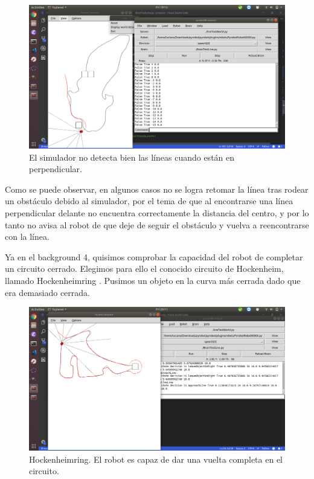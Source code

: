 \documentclass{article}
\begin{document}
\begin{figure}[H]
    \centering
    \includegraphics[width=12cm]{mapa3.png}
    \caption{El simulador no detecta bien las líneas cuando están en perpendicular.}
    \label{fig:mapa3}
\end{figure}

Como se puede observar, en algunos casos no se logra retomar la línea tras rodear un obstáculo debido al simulador, por el tema de que al encontrarse una línea perpendicular delante  no encuentra correctamente la distancia del centro, y por lo tanto no avisa al robot de que deje de seguir el obstáculo y vuelva a reencontrarse con la línea.


Ya en el background 4, quisimos comprobar la capacidad del robot de completar un circuito cerrado. Elegimos para ello el conocido circuito de Hockenheim, llamado Hockenheimring \cite{hockenheimring}. Pusimos un objeto en la curva más cerrada dado que era demasiado cerrada.

\begin{figure}[H]
    \centering
    \includegraphics[width=12cm]{mapa4.png}
    \caption{Hockenheimring. El robot es capaz de dar una vuelta completa en el circuito.}
    \label{fig:mapa4}
\end{figure}
\end{document}

